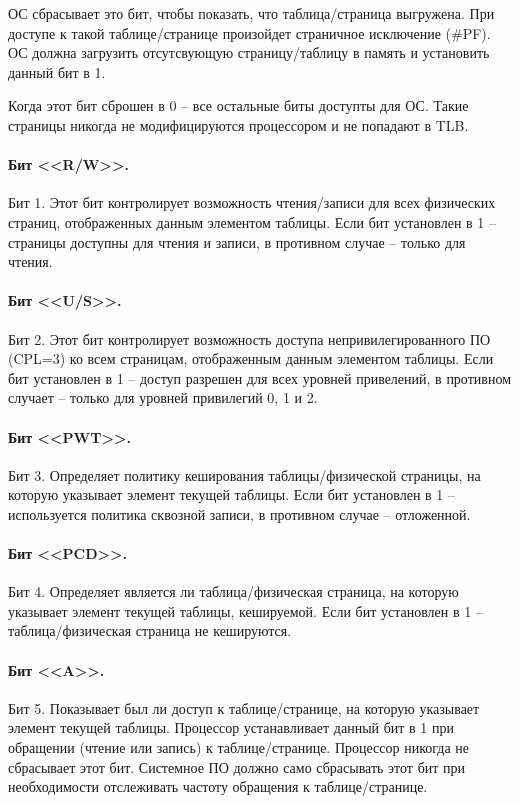 ОС сбрасывает это бит, чтобы показать, что таблица/страница выгружена. При доступе к такой таблице/странице произойдет страничное
исключение (\#PF). ОС должна загрузить отсутсвующую страницу/таблицу в память и установить данный бит в 1.

Когда этот бит сброшен в 0 -- все остальные биты доступты для ОС. Такие страницы никогда не модифицируются процессором и
не попадают в TLB.

\paragraph{Бит <<R/W>>.} Бит 1. Этот бит контролирует возможность чтения/записи для всех физических страниц, отображенных
данным элементом таблицы. Если бит установлен в 1 -- страницы доступны для чтения и записи, в противном случае --
только для чтения.

\paragraph{Бит <<U/S>>.} Бит 2. Этот бит контролирует возможность доступа непривилегированного ПО (CPL=3) ко всем страницам,
отображенным данным элементом таблицы. Если бит установлен в 1 -- доступ разрешен для всех уровней привелений,
в противном случает -- только для уровней привилегий 0, 1 и 2.

\paragraph{Бит <<PWT>>.} Бит 3. Определяет политику кеширования таблицы/физической страницы, на которую указывает
элемент текущей таблицы. Если бит установлен в 1 -- используется политика сквозной записи, в противном случае -- отложенной.

\paragraph{Бит <<PCD>>.} Бит 4. Определяет является ли таблица/физическая страница, на которую указывает элемент
текущей таблицы, кешируемой. Если бит установлен в 1 -- таблица/физическая страница не кешируются.

\paragraph{Бит <<A>>.} Бит 5. Показывает был ли доступ к таблице/странице, на которую указывает элемент текущей таблицы.
Процессор устанавливает данный бит в 1 при обращении (чтение или запись) к таблице/странице. Процессор никогда не
сбрасывает этот бит. Системное ПО должно само сбрасывать этот бит при необходимости отслеживать частоту обращения к
таблице/странице.

